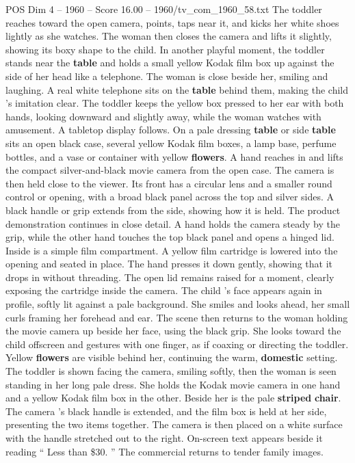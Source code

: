 \begin{textsample}{POS Dim 4 – 1960 – Score 16.00 – 1960/tv\_com\_1960\_58.txt}
The toddler reaches toward the open camera, points, taps near it, and kicks her white shoes lightly as she watches.
The woman then closes the camera and lifts it slightly, showing its boxy shape to the child.
In another playful moment, the toddler stands near the \textbf{table} and holds a small yellow Kodak film box up against the side of her head like a telephone.
The woman is close beside her, smiling and laughing.
A real white telephone sits on the \textbf{table} behind them, making the child ’s imitation clear.
The toddler keeps the yellow box pressed to her ear with both hands, looking downward and slightly away, while the woman watches with amusement.
A tabletop display follows.
On a pale dressing \textbf{table} or side \textbf{table} sits an open black case, several yellow Kodak film boxes, a lamp base, perfume bottles, and a vase or container with yellow \textbf{flowers}.
A hand reaches in and lifts the compact silver-and-black movie camera from the open case.
The camera is then held close to the viewer.
Its front has a circular lens and a smaller round control or opening, with a broad black panel across the top and silver sides.
A black handle or grip extends from the side, showing how it is held.
The product demonstration continues in close detail.
A hand holds the camera steady by the grip, while the other hand touches the top black panel and opens a hinged lid.
Inside is a simple film compartment.
A yellow film cartridge is lowered into the opening and seated in place.
The hand presses it down gently, showing that it drops in without threading.
The open lid remains raised for a moment, clearly exposing the cartridge inside the camera.
The child ’s face appears again in profile, softly lit against a pale background.
She smiles and looks ahead, her small curls framing her forehead and ear.
The scene then returns to the woman holding the movie camera up beside her face, using the black grip.
She looks toward the child offscreen and gestures with one finger, as if coaxing or directing the toddler.
Yellow \textbf{flowers} are visible behind her, continuing the warm, \textbf{domestic} setting.
The toddler is shown facing the camera, smiling softly, then the woman is seen standing in her long pale dress.
She holds the Kodak movie camera in one hand and a yellow Kodak film box in the other.
Beside her is the pale \textbf{striped} \textbf{chair}.
The camera ’s black handle is extended, and the film box is held at her side, presenting the two items together.
The camera is then placed on a white surface with the handle stretched out to the right.
On-screen text appears beside it reading “ Less than \$30. ” The commercial returns to tender family images.

\end{textsample}
